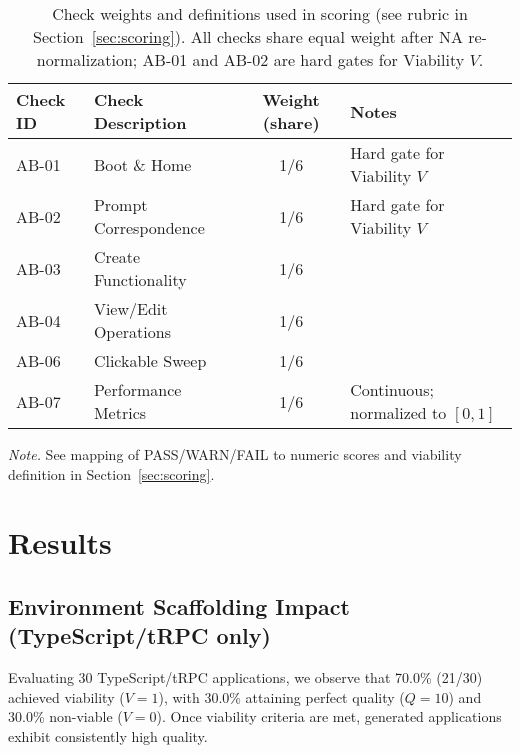 \documentclass{article}
\begin{document}
\begin{table}[t]
\caption{Check weights and definitions used in scoring (see rubric in Section~\ref{sec:scoring}). All checks share equal weight after NA re-normalization; AB-01 and AB-02 are hard gates for Viability $V$.}
\label{tab:check-weights}
\centering
\begin{threeparttable}
\begin{tabular}{llcl}
\toprule
Check ID & Check Description & Weight (share) & Notes \\
\midrule
AB-01 & Boot \& Home & 1/6 & Hard gate for Viability $V$ \\
AB-02 & Prompt Correspondence & 1/6 & Hard gate for Viability $V$ \\
AB-03 & Create Functionality & 1/6 &  \\
AB-04 & View/Edit Operations & 1/6 &  \\
AB-06 & Clickable Sweep & 1/6 &  \\
AB-07 & Performance Metrics & 1/6 & Continuous; normalized to $[0,1]$ \\
\bottomrule
\end{tabular}
\begin{tablenotes}
\item \textit{Note.} See mapping of PASS/WARN/FAIL to numeric scores and viability definition in Section~\ref{sec:scoring}.
\end{tablenotes}
\end{threeparttable}
\end{table}

\section{Results}
\label{sec:results}

\subsection{Environment Scaffolding Impact (TypeScript/tRPC only)}

Evaluating 30 TypeScript/tRPC applications, we observe that 70.0\% (21/30) achieved viability ($V=1$), with 30.0\% attaining perfect quality ($Q=10$) and 30.0\% non-viable ($V=0$). Once viability criteria are met, generated applications exhibit consistently high quality.
\end{document}
